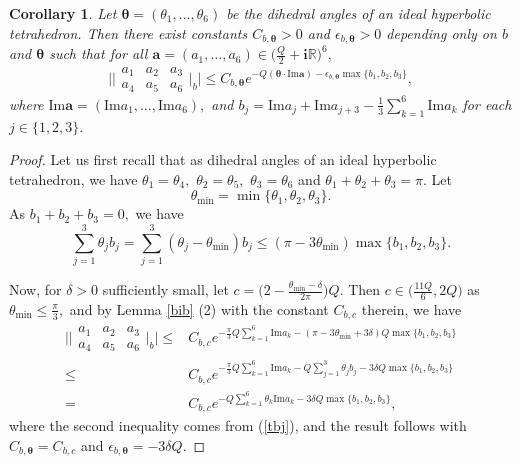 \documentclass[11pt]{article}
\newtheorem{corollary}[theorem]{Corollary}
\theoremstyle{remark}
\theoremstyle{remark}
\numberwithin{equation}{section}
\begin{document}
\begin{corollary}\label{thetabj}
Let $\boldsymbol \theta = (\theta_1,\dots,\theta_6)$ be the dihedral angles of an ideal hyperbolic tetrahedron. Then there exist constants $C_{b,\boldsymbol \theta}>0$ and $\epsilon_{b,\boldsymbol \theta}>0$ depending only on $b$ and $\boldsymbol \theta$ such that for all $\boldsymbol a=(a_1,\dots,a_6)\in \big(\frac{Q}{2}+\mathbf i\mathbb R)^6,$ 
 $$\Bigg|\bigg|\begin{matrix} a_1 & a_2 & a_3  \\ a_4 & a_5 & a_6 \end{matrix} \bigg|_b\Bigg|\leqslant C_{b,\boldsymbol \theta} e^{- Q (\boldsymbol \theta \cdot \mathrm{Im}\boldsymbol a)  - \epsilon_{b,\boldsymbol \theta}\max\{b_1,b_2,b_3\}},$$
 where $\mathrm{Im}\boldsymbol a=(\mathrm{Im}a_1,\dots,\mathrm{Im}a_6),$ and $b_j=\mathrm{Im}a_j+\mathrm{Im}a_{j+3}-\frac{1}{3}\sum_{k=1}^6\mathrm{Im}a_k$  for each $j\in\{1,2,3\}.$ 
\end{corollary}

\begin{proof}
Let us first recall that as dihedral angles of an ideal hyperbolic tetrahedron, we have $\theta_1=\theta_4,$ $\theta_2=\theta_5,$ $\theta_3=\theta_6$ and $\theta_1+\theta_2+\theta_3=\pi.$ Let $$\theta_\text{min} =\min\{\theta_1,\theta_2,\theta_3\}.$$
As $b_1+b_2+b_3=0,$ we have 
\begin{equation}\label{tbj}
\sum_{j=1}^3\theta_jb_j= \sum_{j=1}^3(\theta_j-\theta_\text{min})b_j \leqslant (\pi -3\theta_\text{min})\max\{b_1,b_2,b_3\}.
\end{equation}


Now, for $\delta>0$ sufficiently small, let $c=\big(2-\frac{\theta_\text{min}-\delta}{2\pi}\big)Q.$ Then $c\in \big(\frac{11Q}{6},2Q\big)$ as $\theta_\text{min}\leqslant \frac{\pi}{3},$  and by  Lemma \ref{bib} (2) with  the constant $C_{b,c}$ therein, we have 
\begin{equation*}
\begin{split}
    \Bigg|\bigg|\begin{matrix} a_1 & a_2 & a_3  \\ a_4 & a_5 & a_6 \end{matrix} \bigg|_b\Bigg|\leqslant &  C_{b,c} e^{-\frac{\pi}{3} Q\sum_{k=1}^6\mathrm{Im}a_k -(\pi-3\theta_\text{min}+3\delta) Q\max\{b_1,b_2,b_3\}}\\
\leqslant &  C_{b,c} e^{-\frac{\pi}{3} Q\sum_{k=1}^6\mathrm{Im}a_k -Q\sum_{j=1}^3\theta_jb_j-3\delta Q\max\{b_1,b_2,b_3\}}\\
= &  C_{b,c} e^{-Q\sum_{k=1}^6\theta_k\mathrm{Im}a_k-3\delta Q\max\{b_1,b_2,b_3\}},
\end{split}    
\end{equation*}
where the second inequality comes from (\ref{tbj}), and the result follows with $C_{b,\boldsymbol \theta}=C_{b,c}$ and $\epsilon_{b,\boldsymbol \theta}=-3\delta Q.$
\end{proof}
\end{document}

